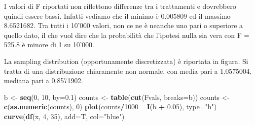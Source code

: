 \documentclass[a4paper,12pt,oneside]{book}
\newenvironment{Shaded}{\begin{snugshade}}{\end{snugshade}}
\newcommand{\KeywordTok}[1]{\textcolor[rgb]{0.13,0.29,0.53}{\textbf{#1}}}
\newcommand{\DataTypeTok}[1]{\textcolor[rgb]{0.13,0.29,0.53}{#1}}
\newcommand{\DecValTok}[1]{\textcolor[rgb]{0.00,0.00,0.81}{#1}}
\newcommand{\FloatTok}[1]{\textcolor[rgb]{0.00,0.00,0.81}{#1}}
\newcommand{\StringTok}[1]{\textcolor[rgb]{0.31,0.60,0.02}{#1}}
\newcommand{\ControlFlowTok}[1]{\textcolor[rgb]{0.13,0.29,0.53}{\textbf{#1}}}
\newcommand{\OperatorTok}[1]{\textcolor[rgb]{0.81,0.36,0.00}{\textbf{#1}}}
\newcommand{\NormalTok}[1]{#1}
\theoremstyle{definition}
\theoremstyle{definition}
\theoremstyle{definition}
\theoremstyle{remark}
\begin{document}
\begin{Shaded}
\end{Shaded}

I valori di F riportati non riflettono differenze tra i trattamenti e
dovrebbero quindi essere bassi. Infatti vediamo che il minimo è 0.005809
ed il massimo 8.6521682. Tra tutti i 10'000 valori, non ce ne è neanche
uno pari o superiore a quello dato, il che vuol dire che la probabilità
che l'ipotesi nulla sia vera con F = 525.8 è minore di 1 su 10'000.

La sampling distribution (opportunamente discretizzata) è riportata in
figura. Si tratta di una distribuzione chiaramente non normale, con
media pari a 1.0575004, mediana pari a 0.8571902.

\begin{Shaded}
\begin{Highlighting}[]
\NormalTok{b <-}\StringTok{ }\KeywordTok{seq}\NormalTok{(}\DecValTok{0}\NormalTok{, }\DecValTok{10}\NormalTok{, }\DataTypeTok{by=}\FloatTok{0.1}\NormalTok{)}
\NormalTok{counts <-}\StringTok{ }\KeywordTok{table}\NormalTok{(}\KeywordTok{cut}\NormalTok{(Fvals, }\DataTypeTok{breaks=}\NormalTok{b))}
\NormalTok{counts <-}\StringTok{ }\KeywordTok{c}\NormalTok{(}\KeywordTok{as.numeric}\NormalTok{(counts), }\DecValTok{0}\NormalTok{)}
\KeywordTok{plot}\NormalTok{(counts}\OperatorTok{/}\DecValTok{1000} \OperatorTok{~}\StringTok{ }\KeywordTok{I}\NormalTok{(b }\OperatorTok{+}\StringTok{ }\FloatTok{0.05}\NormalTok{), }\DataTypeTok{type=}\StringTok{"h"}\NormalTok{)}
\KeywordTok{curve}\NormalTok{(}\KeywordTok{df}\NormalTok{(x, }\DecValTok{4}\NormalTok{, }\DecValTok{35}\NormalTok{), }\DataTypeTok{add=}\NormalTok{T, }\DataTypeTok{col=}\StringTok{"blue"}\NormalTok{)}
\end{Highlighting}
\end{Shaded}
\end{document}
